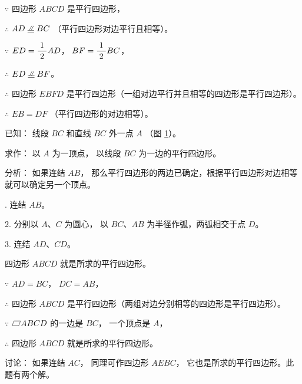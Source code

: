 \zhengming $\because$ \quad 四边形 $ABCD$ 是平行四边形，

$\therefore$ \quad $AD \pxqdy BC$ （平行四边形对边平行且相等）。

\begin{enhancedline}
$\because$ \quad $ED = \dfrac{\; 1 \;}{2} AD$， $BF = \dfrac{\; 1 \;}{2} BC$，

$\therefore$ \quad $ED \pxqdy BF$。
\end{enhancedline}

$\therefore$ \quad 四边形 $EBFD$ 是平行四边形（一组对边平行并且相等的四边形是平行四边形）。

$\therefore$ \quad $EB = DF$ （平行四边形的对边相等）。


\begin{figure}[htbp]
    \centering
    \begin{minipage}[b]{7cm}
        \centering
        
        \caption{}\label{fig:czjh1-4-18}
    \end{minipage}
    \qquad
    \begin{minipage}[b]{7cm}
        \centering
        
        \caption{}\label{fig:czjh1-4-19}
    \end{minipage}
\end{figure}


\liti 已知： 线段 $BC$ 和直线 $BC$ 外一点 $A$ （图 \ref{fig:czjh1-4-19}）。

求作： 以 $A$ 为一顶点， 以线段 $BC$ 为一边的平行四边形。

分析： 如果连结 $AB$， 那么平行四边形的两边已确定，根据平行四边形对边相等就可以确定另一个顶点。

. 连结 $AB$。

2. 分别以 $A$、$C$ 为圆心， 以 $BC$、$AB$ 为半径作弧，两弧相交于点 $D$。

3. 连结 $AD$、$CD$。

四边形 $ABCD$ 就是所求的平行四边形。


\zhengming $\because$ \quad $AD = BC$， $DC = AB$，

$\therefore$ \quad 四边形 $ABCD$ 是平行四边形（两组对边分别相等的四边形是平行四边形）。

$\because$ \quad $\pxsbx ABCD$ 的一边是 $BC$， 一个顶点是 $A$，

$\therefore$ \quad 四边形 $ABCD$ 就是所求的平行四边形。

讨论： 如果连结 $AC$， 同理可作四边形 $AEBC$， 它也是所求的平行四边形。此题有两个解。


\begin{lianxi}





\end{lianxi}


